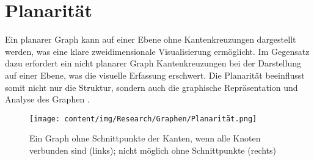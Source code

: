\section{Planarität}

Ein planarer Graph kann auf einer Ebene ohne Kantenkreuzungen dargestellt werden, was eine klare zweidimensionale Visualisierung ermöglicht. Im Gegensatz dazu erfordert ein nicht planarer Graph Kantenkreuzungen bei der Darstellung auf einer Ebene, was die visuelle Erfassung erschwert. Die Planarität beeinflusst somit nicht nur die Struktur, sondern auch die graphische Repräsentation und Analyse des Graphen \cite{lauchli1991planaritat,schmit2018kuratowski}. 

\begin{figure}
    \centering
    \texttt{[image: content/img/Research/Graphen/Planarität.png]}
    \caption{Ein Graph ohne Schnittpunkte der Kanten, wenn alle Knoten verbunden sind (links); nicht möglich ohne Schnittpunkte (rechts)}
    \label{fig:planarität}
\end{figure}
\FloatBarrier